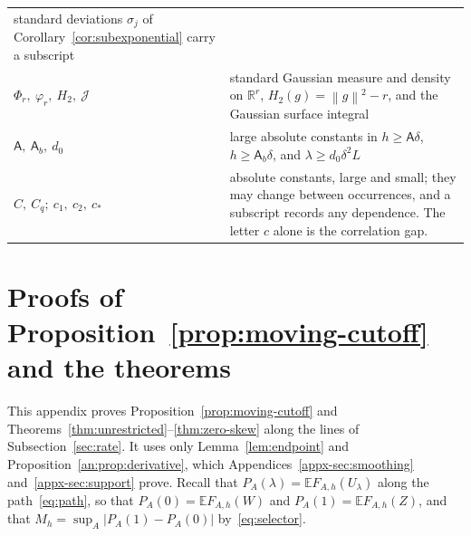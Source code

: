 \documentclass[11pt,letterpaper]{article}
\newif\ifshowrev
\newenvironment{revblock}{\ifshowrev\color{revblue}%
\hypersetup{linkcolor=revblue,citecolor=revblue,urlcolor=revblue}\fi}{}
\newif\ifshowtrim
\newcommand{\trim}[1]{\ifshowtrim{\color{revblue}%
\hypersetup{linkcolor=revblue,citecolor=revblue,urlcolor=revblue}#1}\else#1\fi}
\newcommand{\trs}[1]{\ifshowtrim{\color{revblue}#1}\else#1\fi}
\theoremstyle{remark}
\newcommand{\E}{\mathbb E}
\newcommand{\R}{\mathbb R}
\newcommand{\norm}[1]{\left\lVert#1\right\rVert}
\newcommand{\surf}{\mathcal J}
\begin{document}
\begin{revblock}
\begin{center}
\begin{tabular}{@{}p{}p{}@{}}
{standard deviations \(\sigma_j\) of Corollary~\ref{cor:subexponential}
carry a subscript}\\
\(\Phi_r,\ \varphi_r,\ H_2,\ \surf\) & standard Gaussian measure and
density on \(\R^r\), \(H_2(g)=\norm g^2-r\), and the Gaussian surface
integral\\
\(\mathsf A,\ \mathsf A_b,\ d_0\) & large absolute constants in
\(h\ge\mathsf A\delta\), \(h\ge\mathsf A_b\delta\), and
\(\lambda\ge d_0\delta^2L\)\\
\(C,\ C_q;\ c_1,\ c_2,\ c_*\) & absolute constants, large and small;
they may change between occurrences, and a subscript records any
dependence. The letter \(c\) alone is the correlation gap.\\
\end{tabular}
\end{center}
\end{revblock}

\section{\texorpdfstring{\trs{Proofs of Proposition~\ref{prop:moving-cutoff} and the theorems}}{Proofs of Proposition 2 and the theorems}}\label{sec:main-proof}
\trim{This appendix proves Proposition~\ref{prop:moving-cutoff} and
Theorems~\ref{thm:unrestricted}--\ref{thm:zero-skew} along the lines of
Subsection~\ref{sec:rate}. It uses only Lemma~\ref{lem:endpoint} and
Proposition~\ref{an:prop:derivative}, which
Appendices~\ref{appx-sec:smoothing} and~\ref{appx-sec:support} prove.
Recall that \(P_A(\lambda)=\E F_{A,h}(U_\lambda)\) along the
path~\eqref{eq:path}, so that \(P_A(0)=\E F_{A,h}(W)\) and
\(P_A(1)=\E F_{A,h}(Z)\), and that
\(M_h=\sup_A|P_A(1)-P_A(0)|\) by~\eqref{eq:selector}.}
\end{document}
